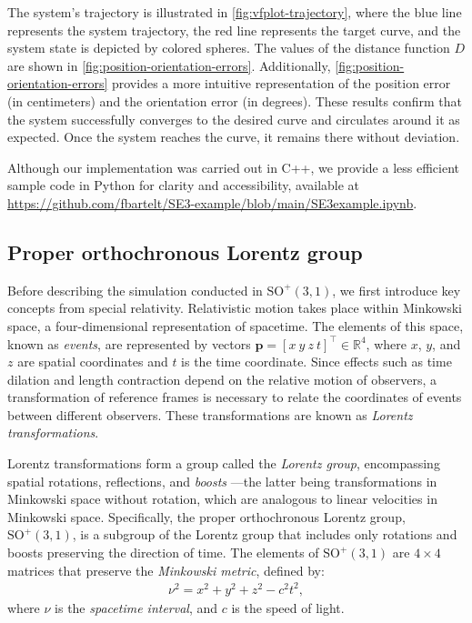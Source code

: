 The system's trajectory is illustrated in \cref{fig:vfplot-trajectory}, where the blue line represents the system trajectory, the red line represents the target curve, and the system state is depicted by colored spheres. The values of the distance function $D$ are shown in \cref{fig:position-orientation-errors}. Additionally, \cref{fig:position-orientation-errors} provides a more intuitive representation of the position error (in centimeters) and the orientation error (in degrees). These results confirm that the system successfully converges to the desired curve and circulates around it as expected. Once the system reaches the curve, it remains there without deviation. 

Although our implementation was carried out in C++, we provide a less efficient sample code in Python for clarity and accessibility, available at \url{https://github.com/fbartelt/SE3-example/blob/main/SE3example.ipynb}.
\subsection{Proper orthochronous Lorentz group}
Before describing the simulation conducted in $\text{SO}^+(3, 1)$, we first introduce key concepts from special relativity. Relativistic motion takes place within Minkowski space, a four-dimensional representation of spacetime. The elements of this space, known as \emph{events}, are represented by vectors $\mathbf{p}=[x\ y \ z\ t]^\top\in\mathbb{R}^4$, where $x$, $y$, and $z$ are spatial coordinates and $t$ is the time coordinate. Since effects such as time dilation and length contraction depend on the relative motion of observers, a transformation of reference frames is necessary to relate the coordinates of events between different observers. These transformations are known as \emph{Lorentz transformations}.

Lorentz transformations form a group called the \emph{Lorentz group}, encompassing spatial rotations, reflections, and \emph{boosts} \citep[p. 12]{Carroll2019}---the latter being transformations in Minkowski space without rotation, which are analogous to linear velocities in Minkowski space. Specifically, the proper orthochronous Lorentz group, $\text{SO}^+(3, 1)$, is a subgroup of the Lorentz group that includes only rotations and boosts preserving the direction of time. The elements of $\text{SO}^+(3, 1)$ are $4 \times 4$ matrices that preserve the \emph{Minkowski metric}, defined by:
\begin{align}
    \nu^2 = x^2 + y^2 + z^2 - c^2t^2, \label{eq:results-lorentz-metric}
\end{align}
where $\nu$ is the \emph{spacetime interval}, and $c$ is the speed of light.

